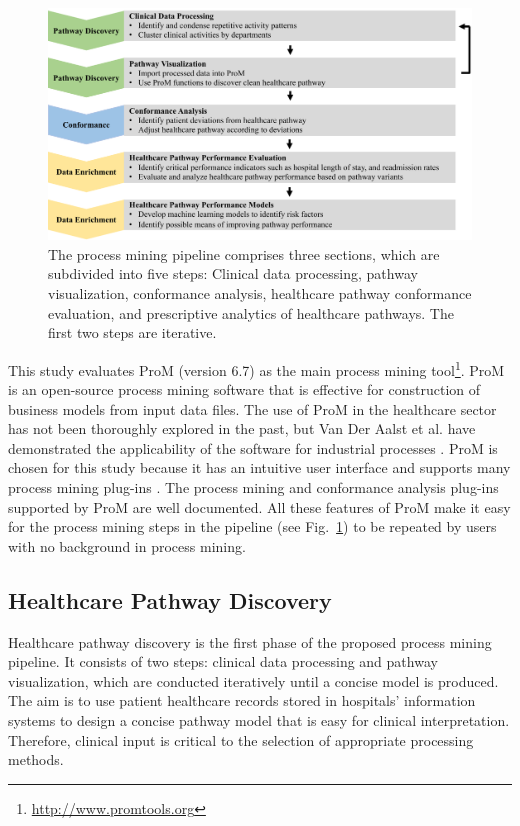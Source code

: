 \begin{figure}[t]
\centering
\includegraphics[width=\textwidth]{images/pipeline_diagram_journal.pdf}
\caption{The process mining pipeline comprises three sections, which are subdivided into five steps: Clinical data processing, pathway visualization, conformance analysis, healthcare pathway conformance evaluation, and prescriptive analytics of healthcare pathways. The first two steps are iterative.}
\label{fig:pipeline}
\end{figure}

This study evaluates ProM (version 6.7) as the main process mining tool\footnote{\url{http://www.promtools.org}}. 
ProM is an open-source process mining software that is effective for construction of business models from input data files. The use of ProM in the healthcare sector has not been thoroughly explored in the past, but Van Der Aalst et al.  have demonstrated the applicability of the software for industrial processes \cite{VanDerAalst2007}. ProM is chosen for this study because it has an intuitive user interface and supports many process mining plug-ins \cite{VanDongen2005}. The process mining and conformance analysis plug-ins supported by ProM are well documented. All these features of ProM make it easy for the process mining steps in the pipeline (see Fig.~\ref{fig:pipeline}) to be repeated by users with no background in process mining.

\subsection{Healthcare Pathway Discovery}
Healthcare pathway discovery is the first phase of the proposed process mining pipeline. It consists of two steps: clinical data processing and pathway visualization, which are conducted iteratively until a concise model is produced.
The aim is to use patient healthcare records stored in hospitals’ information systems to design a concise pathway model that is easy for clinical interpretation. Therefore, clinical input is critical to the selection of appropriate processing methods. 

